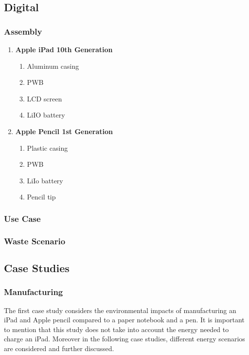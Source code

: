 \subsection{Digital}\label{subsec:digital_scenario}

\subsubsection*{Assembly}
\begin{enumerate}
    \item \textbf{Apple iPad 10th Generation}
    \begin{enumerate}
        \item Aluminum casing
        \item PWB
        \item LCD screen
        \item LiIO battery
    \end{enumerate}
    \item \textbf{Apple Pencil 1st Generation}
    \begin{enumerate}
        \item Plastic casing
        \item PWB
        \item LiIo battery
        \item Pencil tip
    \end{enumerate}
\end{enumerate}

\subsubsection*{Use Case}

\subsubsection*{Waste Scenario}

\subsection{Case Studies}\label{subsec:case_studies}

\subsubsection*{Manufacturing}
The first case study considers the environmental impacts of manufacturing an iPad and Apple pencil compared to a paper notebook and a pen. It is important to mention that this study does not take into account the energy needed to charge an iPad. Moreover in the following case studies, different energy scenarios are considered and further discussed. 

